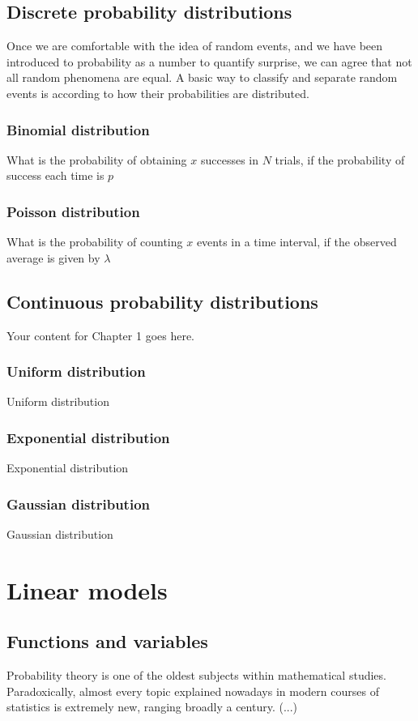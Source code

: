 \documentclass{book}
\begin{document}
\section{Discrete probability distributions}
Once we are comfortable with the idea of random events, and we have been introduced to probability as a number to quantify surprise, we can agree that not all random phenomena are equal. A basic way to classify and separate random events is according to how their probabilities are distributed.

\subsection{Binomial distribution}
What is the probability of obtaining $x$ successes in $N$ trials, if the probability of success each time is $p$


\subsection{Poisson distribution}
What is the probability of counting $x$ events in a time interval, if the observed average is given by $\lambda$

\section{Continuous probability distributions}
Your content for Chapter 1 goes here.

\subsection{Uniform distribution}
Uniform distribution

\subsection{Exponential distribution}
Exponential distribution

\subsection{Gaussian distribution}
Gaussian distribution

\chapter{Linear models}

\section{Functions and variables}
Probability theory is one of the oldest subjects within mathematical studies. Paradoxically, almost every topic explained nowadays in modern courses of statistics is extremely new, ranging broadly a century. (...)\\
\end{document}
